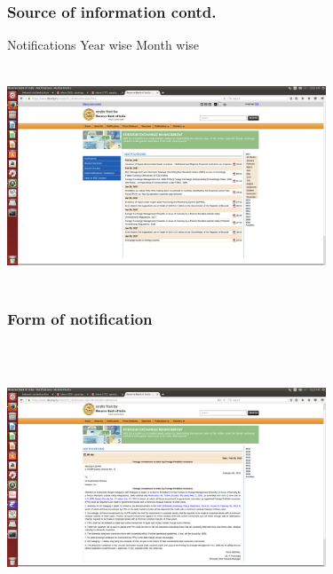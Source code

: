 \documentclass{beamer}
\begin{document}
\begin{frame}
\frametitle{Source of information contd.}
Notifications \textrightarrow Year wise \textrightarrow Month wise
\begin{center}
\includegraphics[height=65mm, width=95mm]{PICTURES/20170221_FEMANotifications.png}
\end{center}
\end{frame}
\begin{frame}
\frametitle{Form of notification}
\begin{center}
\includegraphics[height=80mm, width=95mm]{PICTURES/20170221_sampleNotification.png}
\end{center}
\end{frame}
\end{document}
